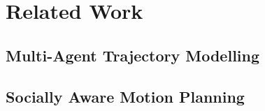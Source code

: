 \chapter{Related Work}
\label{text:related_work}

\section{Multi-Agent Trajectory Modelling}
\label{text:related_work/trajectory_modelling}

\section{Socially Aware Motion Planning}
\label{text:related_work/motion_planning}
